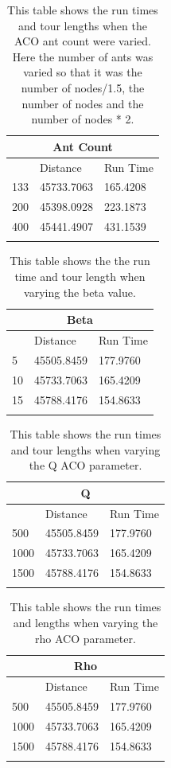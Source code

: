\begin{longtable}[c]{|l|l|l|}
\hline
\multicolumn{3}{|c|}{Ant Count}  \\ \hline
\endfirsthead
%
\endhead
%
    & Distance    & Run Time   \\ \hline
133 & 45733.7063 & 165.4208  \\ \hline
200 & 45398.0928 & 223.1873 \\ \hline
400 & 45441.4907 & 431.1539 \\ \hline
\caption{This table shows the run times and tour lengths when the ACO ant count were varied. Here the number of ants was varied so that it was the number of nodes/1.5, the number of nodes and the number of nodes * 2.}
\label{tab:ant_count_aco_table}\\
\end{longtable}

\begin{longtable}[c]{|l|l|l|}
\hline
\multicolumn{3}{|c|}{Beta}     \\ \hline
\endfirsthead
%
\endhead
%
   & Distance    & Run Time  \\ \hline
5  & 45505.8459 & 177.9760   \\ \hline
10 & 45733.7063 & 165.4209   \\ \hline
15 & 45788.4176 & 154.8633 \\ \hline
\caption{This table shows the the run time and tour length when varying the beta value.}
\label{tab:beta_aco_table}\\
\end{longtable}

\begin{longtable}[c]{|l|l|l|}
\hline
\multicolumn{3}{|c|}{Q}      \\ \hline
\endfirsthead
%
\endhead
%
     & Distance   & Run Time \\ \hline
500  & 45505.8459 & 177.9760 \\ \hline
1000 & 45733.7063 & 165.4209 \\ \hline
1500 & 45788.4176 & 154.8633 \\ \hline
\caption{This table shows the run times and tour lengths when varying the Q ACO parameter.}
\label{tab:q_aco_table}\\
\end{longtable}

\begin{longtable}[c]{|l|l|l|}
\hline
\multicolumn{3}{|c|}{Rho}    \\ \hline
\endfirsthead
%
\endhead
%
     & Distance   & Run Time \\ \hline
500  & 45505.8459 & 177.9760 \\ \hline
1000 & 45733.7063 & 165.4209 \\ \hline
1500 & 45788.4176 & 154.8633 \\ \hline
\caption{This table shows the run times and lengths when varying the rho ACO parameter.}
\label{tab:rho_aco_table}\\
\end{longtable}

